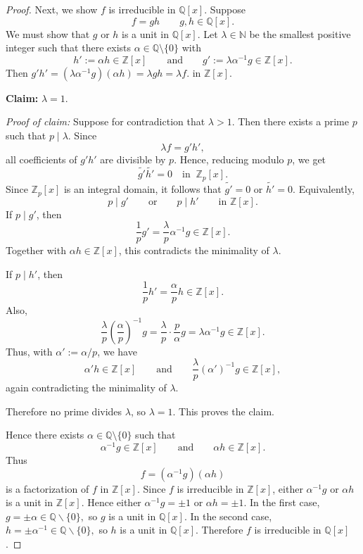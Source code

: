 {\begin{proof}
Next, we show $f$ is irreducible in $\mathbb{Q}[x]$. Suppose 
$$f = gh \quad \quad g, h \in \mathbb{Q}[x].$$ 
We must show that $g$ or $h$ is a unit in $\mathbb{Q}[x]$.
Let \(\lambda \in \mathbb{N}\) be the smallest positive integer such that there exists \( \alpha \in \mathbb{Q}\setminus\{0\} \) with
\[
h' := \alpha h \in \mathbb{Z}[x]
\qquad \text{and} \qquad
g' := \lambda \alpha^{-1} g \in \mathbb{Z}[x].
\]
Then \(
g'h' = (\lambda \alpha^{-1} g)(\alpha h)=\lambda gh=\lambda f.
\) in $\mathbb{Z}[x]$.

\noindent \textbf{Claim:} \(\lambda = 1\).

\noindent \textit{Proof of claim:} Suppose for contradiction that \(\lambda > 1\). Then there exists a prime \(p\) such that \(p \mid \lambda\). Since
\[
\lambda f = g'h',
\]
all coefficients of \(g'h'\) are divisible by \(p\). Hence, reducing modulo \(p\), we get
\[
\widetilde{g'}\widetilde{h'} = 0
\quad \text{in }\ \mathbb{Z}_p[x].
\]
Since \(\mathbb{Z}_p[x]\) is an integral domain, it follows that
\(
\widetilde{g'}=0\) or \(\widetilde{h'}=0.\)
Equivalently,
\[
p \mid g' \qquad \text{or} \qquad p \mid h'
\qquad \text{in } \mathbb{Z}[x].
\]
If \(p \mid g'\), then
\[
\frac{1}{p}g'=\frac{\lambda}{p}\alpha^{-1}g \in \mathbb{Z}[x].
\]
Together with \(\alpha h \in \mathbb{Z}[x]\), this contradicts the minimality of \(\lambda\).

If \(p \mid h'\), then
\[
\frac{1}{p}h'=\frac{\alpha}{p}h \in \mathbb{Z}[x].
\]
Also,
\[
\frac{\lambda}{p}\left(\frac{\alpha}{p}\right)^{-1}g
=
\frac{\lambda}{p}\cdot \frac{p}{\alpha}g
=
\lambda \alpha^{-1}g
\in \mathbb{Z}[x].
\]
Thus, with \(\alpha' := \alpha/p\), we have
\[
\alpha' h \in \mathbb{Z}[x]
\qquad \text{and} \qquad
\frac{\lambda}{p}(\alpha')^{-1}g \in \mathbb{Z}[x],
\]
again contradicting the minimality of \(\lambda\).

Therefore no prime divides \(\lambda\), so \(\lambda=1\). This proves the claim.

\medskip

Hence there exists \(\alpha \in \mathbb{Q}\setminus\{0\}\) such that
\[
\alpha^{-1}g \in \mathbb{Z}[x]
\qquad \text{and} \qquad
\alpha h \in \mathbb{Z}[x].
\]
Thus
\[
f = (\alpha^{-1}g)(\alpha h)
\]
is a factorization of \(f\) in \(\mathbb{Z}[x]\). Since \(f\) is irreducible in \(\mathbb{Z}[x]\), either \(\alpha^{-1}g\) or \(\alpha h\) is a unit in \(\mathbb{Z}[x]\). Hence either \(\alpha^{-1}g=\pm 1\) or \(\alpha h=\pm 1\). In the first case,
\(
g=\pm \alpha \in \mathbb{Q} \backslash \{0\},
\)
so \(g\) is a unit in \(\mathbb{Q}[x]\). In the second case,
\(
h=\pm \alpha^{-1}  \in \mathbb{Q} \backslash \{0\},
\) so \(h\) is a unit in \(\mathbb{Q}[x]\). Therefore \(f\) is irreducible in \(\mathbb{Q}[x]\).
\end{proof}

}
